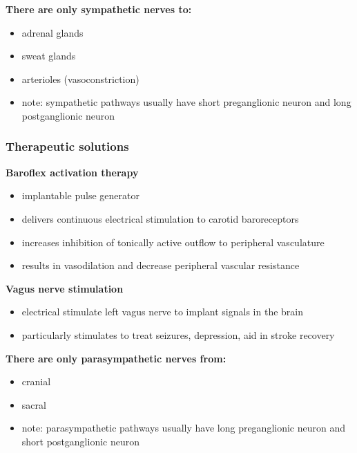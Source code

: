 \documentclass[11pt,fleqn]{book}
\begin{document}
\textbf{There are only sympathetic nerves to:}
\begin{itemize}
    \item adrenal glands
    \item sweat glands
    \item arterioles (vasoconstriction)
    \item note: sympathetic pathways usually have short preganglionic neuron and long postganglionic neuron
\end{itemize}

\subsubsection{Therapeutic solutions}
\textbf{Baroflex activation therapy}
\begin{itemize}
    \item implantable pulse generator
    \item delivers continuous electrical stimulation to carotid baroreceptors
    \item increases inhibition of tonically active outflow to peripheral vasculature
    \item results in vasodilation and decrease peripheral vascular resistance
\end{itemize}

\textbf{Vagus nerve stimulation}
\begin{itemize}
    \item electrical stimulate left vagus nerve to implant signals in the brain
    \item particularly stimulates to treat seizures, depression, aid in stroke recovery
\end{itemize}

\textbf{There are only parasympathetic nerves from:}
\begin{itemize}
    \item cranial
    \item sacral
    \item note: parasympathetic pathways usually have long preganglionic neuron and short postganglionic neuron
\end{itemize}
\end{document}
